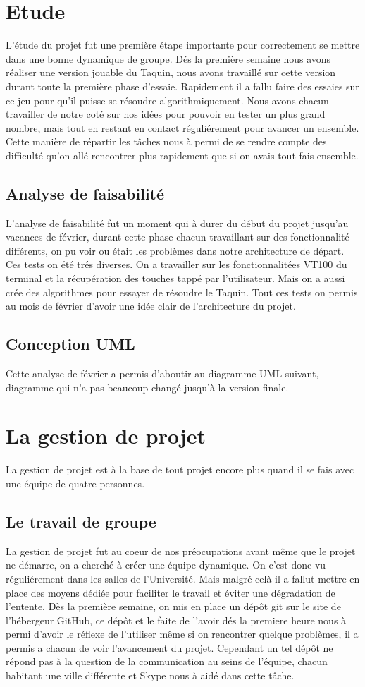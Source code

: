 \documentclass[a4paper,twoside,12pt]{report}
\begin{document}
%
\chapter{Etude}
L'étude du projet fut une première étape importante pour correctement se mettre dans une bonne dynamique de groupe. Dés la première semaine
nous avons réaliser une version jouable du Taquin, nous avons travaillé sur cette version durant toute la première phase d'essaie.
Rapidement il a fallu faire des essaies sur ce jeu pour qu'il puisse se résoudre algorithmiquement. Nous avons chacun travailler de notre
coté sur nos idées pour pouvoir en tester un plus grand nombre, mais tout en restant en contact réguliérement pour avancer un ensemble.
Cette manière de répartir les tâches nous à permi de se rendre compte des difficulté qu'on allé rencontrer plus rapidement que si on avais
tout fais ensemble.
%
\section{Analyse de faisabilité}
L'analyse de faisabilité fut un moment qui à durer du début du projet jusqu'au vacances de février, durant cette phase chacun travaillant
sur des fonctionnalité différents, on pu voir ou était les problèmes dans notre architecture de départ. Ces tests on été trés diverses. On
a travailler sur les fonctionnalitées VT100 du terminal et la récupération des touches tappé par l'utilisateur. Mais on a aussi crée des
algorithmes pour essayer de résoudre le Taquin. Tout ces tests on permis au mois de février d'avoir une idée clair de l'architecture du
projet.
\section{Conception UML}
Cette analyse de février a permis d'aboutir au diagramme UML suivant, diagramme qui n'a pas beaucoup changé jusqu'à la version finale.
\chapter{La gestion de projet}
%
La gestion de projet est à la base de tout projet encore plus quand il se fais avec une équipe de quatre personnes.
\section{Le travail de groupe}
%
La gestion de projet fut au coeur de nos préocupations avant même que le projet ne démarre, on a cherché à créer une équipe dynamique. On
c'est donc vu réguliérement dans les salles de l'Université. Mais
malgré celà il a fallut mettre en place des moyens dédiée pour faciliter le travail et éviter une dégradation de l'entente. Dès la
première semaine, on mis en place un dépôt git sur le site de l'hébergeur GitHub, ce dépôt et le faite de l'avoir dés la premiere heure
nous à permi d'avoir le réflexe de l'utiliser même si on rencontrer quelque problèmes, il a permis a chacun de voir l'avancement du projet.
Cependant un tel dépôt ne répond pas à la question de la communication au seins de l'équipe, chacun habitant une ville différente et Skype
nous à aidé dans cette tâche.
\end{document}
